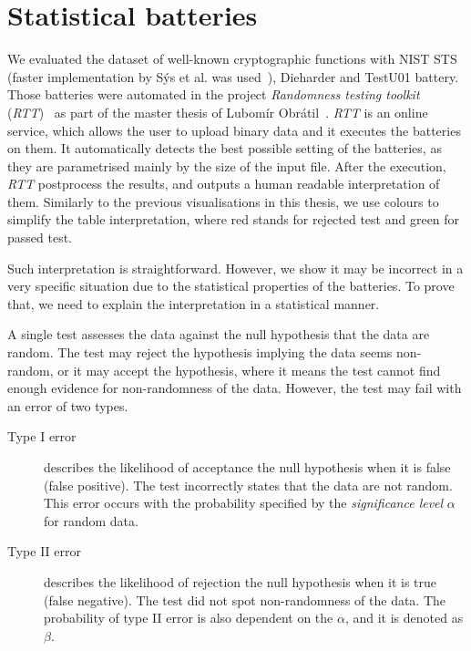 \documentclass[
    digital,    %
    oneside,    %
    color,
    11pt,
    nocover,
    notable,
    nolof,
    nolot,
]{fithesis3}
\begin{document}
\section{Statistical batteries}
\label{sec:relatwork-stat}

We evaluated the dataset of well-known cryptographic functions with NIST STS (faster implementation by Sýs et al. was used~\cite{sys2016algorithm}), Dieharder and TestU01 battery. Those batteries were automated in the project \textit{Randomness testing toolkit} (\textit{RTT})~\cite{rttgit} as part of the master thesis of Lubomír Obrátil~\cite{obratilMgrThesis}. \textit{RTT} is an online service, which allows the user to upload binary data and it executes the batteries on them. It automatically detects the best possible setting of the batteries, as they are parametrised mainly by the size of the input file. After the execution, \textit{RTT} postprocess the results, and outputs a human readable interpretation of them. Similarly to the previous visualisations in this thesis, we use colours to simplify the table interpretation, where red stands for rejected test and green for passed test.

Such interpretation is straightforward. However, we show it may be incorrect in a very specific situation due to the statistical properties of the batteries. To prove that, we need to explain the interpretation in a statistical manner.

A single test assesses the data against the null hypothesis that the data are random. The test may reject the hypothesis implying the data seems non-random, or it may accept the hypothesis, where it means the test cannot find enough evidence for non-randomness of the data. However, the test may fail with an error of two types.

\begin{description}
    \item[Type I error] describes the likelihood of acceptance the null hypothesis when it is false (false positive). The test incorrectly states that the data are not random. This error occurs with the probability specified by the \textit{significance level} $\alpha$ for random data.
    \item[Type II error] describes the likelihood of rejection the null hypothesis when it is true (false negative). The test did not spot non-randomness of the data. The probability of type II error is also dependent on the $\alpha$, and it is denoted as $\beta$.
\end{description}
\end{document}
